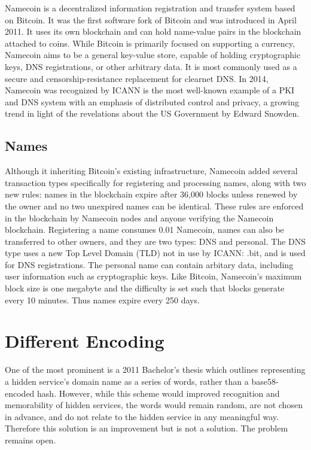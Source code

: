 Namecoin is a decentralized information registration and transfer system based on Bitcoin. It was the first software fork of Bitcoin and was introduced in April 2011. It uses its own blockchain and can hold name-value pairs in the blockchain attached to coins. While Bitcoin is primarily focused on supporting a currency, Namecoin aims to be a general key-value store, capable of holding cryptographic keys, DNS registrations, or other arbitrary data. It is most commonly used as a secure and censorship-resistance replacement for clearnet DNS. In 2014, Namecoin was recognized by ICANN is the most well-known example of a PKI and DNS system with an emphasis of distributed control and privacy, a growing trend in light of the revelations about the US Government by Edward Snowden. %

\subsection{Names}

Although it inheriting Bitcoin's existing infrastructure, Namecoin added several transaction types specifically for registering and processing names, along with two new rules: names in the blockchain expire after 36,000 blocks unless renewed by the owner and no two unexpired names can be identical. These rules are enforced in the blockchain by Namecoin nodes and anyone verifying the Namecoin blockchain. Registering a name consumes 0.01 Namecoin, names can also be transferred to other owners, and they are two types: DNS and personal. The DNS type uses a new Top Level Domain (TLD) not in use by ICANN: .bit, and is used for DNS registrations. The personal name can contain arbitary data, including user information such as cryptographic keys. Like Bitcoin, Namecoin's maximum block size is one megabyte and the difficulty is set such that blocks generate every 10 minutes. Thus names expire every 250 days. 





\section{Different Encoding}

One of the most prominent is a 2011 Bachelor's thesis which outlines representing a hidden service's domain name as a series of words, rather than a base58-encoded hash.\cite{NicolussiThesis2011} However, while this scheme would improved recognition and memorability of hidden services, the words would remain random, are not chosen in advance, and do not relate to the hidden service in any meaningful way. Therefore this solution is an improvement but is not a solution. The problem remains open.